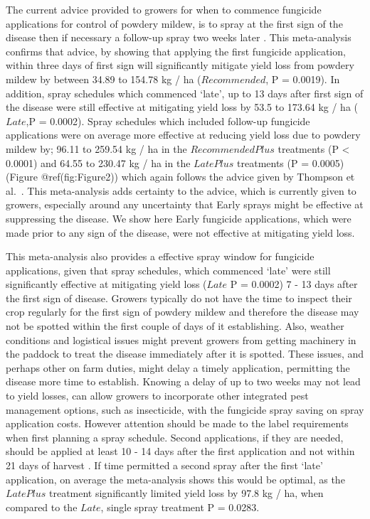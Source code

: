 \documentclass[agronomy,article,submit,moreauthors,pdftex]{mdpi}
\begin{document}
The current advice provided to growers for when to commence fungicide
applications for control of powdery mildew, is to spray at the first
sign of the disease then if necessary a follow-up spray two weeks later
\citep{SueThompson2016, Sparks2017}. This meta-analysis confirms that
advice, by showing that applying the first fungicide application, within
three days of first sign will significantly mitigate yield loss from
powdery mildew by between 34.89 to 154.78 kg / ha (\(Recommended\), P =
0.0019). In addition, spray schedules which commenced `late', up to 13
days after first sign of the disease were still effective at mitigating
yield loss by 53.5 to 173.64 kg / ha (\(Late\),P = 0.0002). Spray
schedules which included follow-up fungicide applications were on
average more effective at reducing yield loss due to powdery mildew by;
96.11 to 259.54 kg / ha in the \(RecommendedPlus\) treatments (P
\textless{} 0.0001) and 64.55 to 230.47 kg / ha in the \(LatePlus\)
treatments (P = 0.0005) (Figure @ref(fig:Figure2)) which again follows
the advice given by Thompson et al.~\citep{SueThompson2016}. This
meta-analysis adds certainty to the advice, which is currently given to
growers, especially around any uncertainty that Early sprays might be
effective at suppressing the disease. We show here Early fungicide
applications, which were made prior to any sign of the disease, were not
effective at mitigating yield loss.

This meta-analysis also provides a effective spray window for fungicide
applications, given that spray schedules, which commenced `late' were
still significantly effective at mitigating yield loss (\(Late\) P =
0.0002) 7 - 13 days after the first sign of disease. Growers typically
do not have the time to inspect their crop regularly for the first sign
of powdery mildew and therefore the disease may not be spotted within
the first couple of days of it establishing. Also, weather conditions
and logistical issues might prevent growers from getting machinery in
the paddock to treat the disease immediately after it is spotted. These
issues, and perhaps other on farm duties, might delay a timely
application, permitting the disease more time to establish. Knowing a
delay of up to two weeks may not lead to yield losses, can allow growers
to incorporate other integrated pest management options, such as
insecticide, with the fungicide spray saving on spray application costs.
However attention should be made to the label requirements when first
planning a spray schedule. Second applications, if they are needed,
should be applied at least 10 - 14 days after the first application and
not within 21 days of harvest \citep{APVMAcustodia}. If time permitted a
second spray after the first `late' application, on average the
meta-analysis shows this would be optimal, as the \(LatePlus\) treatment
significantly limited yield loss by 97.8 kg / ha, when compared to the
\(Late\), single spray treatment P = 0.0283.
\end{document}
